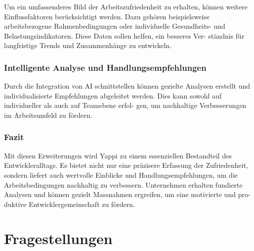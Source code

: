 \documentclass[12pt,a4paper]{report}
\begin{document}
Um ein umfassenderes Bild der Arbeitszufriedenheit zu erhalten, können weitere Einflussfaktoren
berücksichtigt werden. Dazu gehören beispielsweise arbeitsbezogene Rahmenbedingungen oder
individuelle Gesundheits- und Belastungsindikatoren. Diese Daten sollen helfen, ein besseres Ver-
ständnis für langfristige Trends und Zusammenhänge zu entwickeln.

\subsubsection{Intelligente Analyse und Handlungsempfehlungen}

Durch die Integration von AI schnittstellen können gezielte Analysen erstellt und individualisierte
Empfehlungen abgeleitet werden. Dies kann sowohl auf individueller als auch auf Teamebene erfol-
gen, um nachhaltige Verbesserungen im Arbeitsumfeld zu fördern.

\subsubsection{Fazit}

Mit diesen Erweiterungen wird Yappi zu einem essenziellen Bestandteil des Entwickleralltags. Es
bietet nicht nur eine präzisere Erfassung der Zufriedenheit, sondern liefert auch wertvolle Einblicke
und Handlungsempfehlungen, um die Arbeitsbedingungen nachhaltig zu verbessern. Unternehmen
erhalten fundierte Analysen und können gezielt Massnahmen ergreifen, um eine motivierte und pro-
duktive Entwicklergemeinschaft zu fördern.

\section{Fragestellungen}
\end{document}
